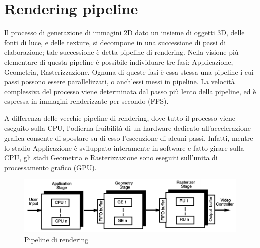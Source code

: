\section{Rendering pipeline}
\label{sec:chapter_stato_arte_rendering_pipeline}

Il processo di generazione di immagini 2D dato un insieme di oggetti 3D, delle fonti di luce, e delle texture, si decompone in una successione di passi di elaborazione; tale successione è detta pipeline di rendering. Nella visione più elementare di questa pipeline è possibile individuare tre fasi: Applicazione, Geometria, Rasterizzazione.
Ognuna di queste fasi è essa stessa una pipeline i cui passi possono essere parallelizzati, o anch’essi messi in pipeline. La velocità complessiva del processo viene determinata dal passo più lento della pipeline, ed è espressa in immagini renderizzate per secondo (FPS).

A differenza delle vecchie pipeline di rendering, dove tutto il processo viene eseguito sulla CPU, l’odierna fruibilità di un hardware dedicato all’accelerazione grafica consente di spostare su di esso l’esecuzione di alcuni passi. Infatti, mentre lo stadio Applicazione è sviluppato interamente in software e fatto girare sulla CPU, gli stadi Geometria e Rasterizzazione sono eseguiti sull’unita di processamento grafico (GPU).

\begin{figure}[htb]
 \centering
 \includegraphics[width=1.0\linewidth]{images/chapter_stato_arte/stato_arte_pipeline.png}\hfill
 \caption[Pipeline di rendering]{Pipeline di rendering}
 \label{fig:stato_arte_pipeline}
\end{figure}

